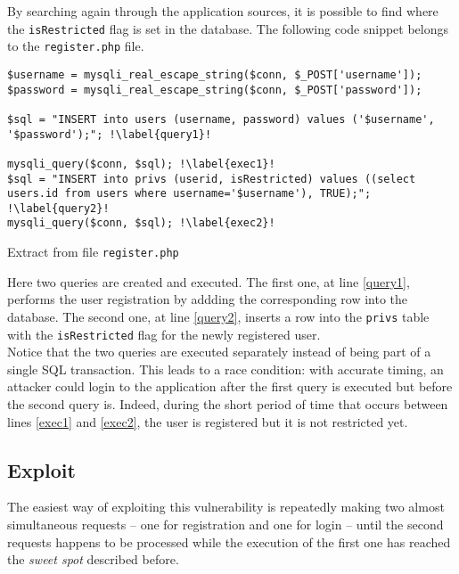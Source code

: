 By searching again through the application sources, it is possible to find where the \texttt{isRestricted} flag is set in the database. The following code snippet belongs to the \texttt{register.php} file.

\begin{listing}[H]
\begin{verbatim}
$username = mysqli_real_escape_string($conn, $_POST['username']);
$password = mysqli_real_escape_string($conn, $_POST['password']);

$sql = "INSERT into users (username, password) values ('$username', '$password');"; !\label{query1}!

mysqli_query($conn, $sql); !\label{exec1}!
$sql = "INSERT into privs (userid, isRestricted) values ((select users.id from users where username='$username'), TRUE);"; !\label{query2}!
mysqli_query($conn, $sql); !\label{exec2}!
\end{verbatim}
\caption{Extract from file \texttt{register.php}}
\end{listing}

Here two queries are created and executed. The first one, at line \ref{query1}, performs the user registration by addding the corresponding row into the database. The second one, at line \ref{query2}, inserts a row into the \texttt{privs} table with the \texttt{isRestricted} flag for the newly registered user. \\

Notice that the two queries are executed separately instead of being part of a single SQL transaction. This leads to a race condition: with accurate timing, an attacker could login to the application after the first query is executed but before the second query is. Indeed, during the short period of time that occurs between lines \ref{exec1} and \ref{exec2}, the user is registered but it is not restricted yet. \\

\subsection{Exploit}

The easiest way of exploiting this vulnerability is repeatedly making two almost simultaneous requests -- one for registration and one for login -- until the second requests happens to be processed while the execution of the first one has reached the \textit{sweet spot} described before.

